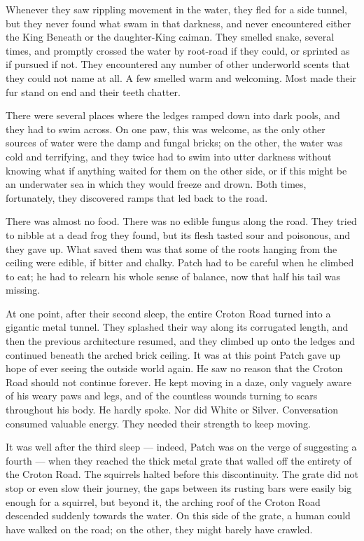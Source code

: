 \documentclass[12pt]{book}
\begin{document}
Whenever they saw rippling movement in the water, they fled for a side
tunnel, but they never found what swam in that darkness, and never
encountered either the King Beneath or the daughter-King caiman. They
smelled snake, several times, and promptly crossed the water by
root-road if they could, or sprinted as if pursued if not. They
encountered any number of other underworld scents that they could not
name at all. A few smelled warm and welcoming. Most made their fur
stand on end and their teeth chatter.

There were several places where the ledges ramped down into dark
pools, and they had to swim across. On one paw, this was welcome, as
the only other sources of water were the damp and fungal bricks; on
the other, the water was cold and terrifying, and they twice had to
swim into utter darkness without knowing what if anything waited for
them on the other side, or if this might be an underwater sea in which
they would freeze and drown. Both times, fortunately, they discovered
ramps that led back to the road.

There was almost no food. There was no edible fungus along the
road. They tried to nibble at a dead frog they found, but its flesh
tasted sour and poisonous, and they gave up. What saved them was that
some of the roots hanging from the ceiling were edible, if bitter and
chalky. Patch had to be careful when he climbed to eat; he had to
relearn his whole sense of balance, now that half his tail was
missing.

At one point, after their second sleep, the entire Croton Road turned
into a gigantic metal tunnel. They splashed their way along its
corrugated length, and then the previous architecture resumed, and
they climbed up onto the ledges and continued beneath the arched brick
ceiling. It was at this point Patch gave up hope of ever seeing the
outside world again. He saw no reason that the Croton Road should not
continue forever. He kept moving in a daze, only vaguely aware of his
weary paws and legs, and of the countless wounds turning to scars
throughout his body. He hardly spoke. Nor did White or
Silver. Conversation consumed valuable energy. They needed their
strength to keep moving.

It was well after the third sleep --- indeed, Patch was on the verge
of suggesting a fourth --- when they reached the thick metal grate
that walled off the entirety of the Croton Road. The squirrels halted
before this discontinuity. The grate did not stop or even slow their
journey, the gaps between its rusting bars were easily big enough for
a squirrel, but beyond it, the arching roof of the Croton Road
descended suddenly towards the water. On this side of the grate, a
human could have walked on the road; on the other, they might barely
have crawled.
\end{document}
